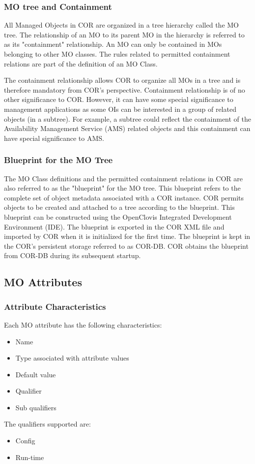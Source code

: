 \begin{flushleft}
\subsubsection{MO tree and Containment}

All Managed Objects in COR are organized in a tree hierarchy called the MO tree. The relationship of an MO to its parent MO in the hierarchy is referred 
to as its "containment" relationship. An MO can only be contained in MOs belonging to other MO classes. The rules related to permitted containment relations 
are part of the definition of an MO Class.

\par
The containment relationship allows COR to organize all MOs in a tree and is therefore mandatory from COR's perspective.
Containment relationship is of no other significance to COR. However, it can have some special significance to management applications as some OIs 
can be interested in a group of related objects (in a subtree). For example, a subtree could reflect the containment of the 
Availability Management Service (AMS) related objects and this containment can have special significance to AMS.

\subsubsection{Blueprint for the MO Tree}

The MO Class definitions and the permitted containment relations in COR are also referred to as the "blueprint" for the MO tree. This blueprint 
refers to the complete set of object metadata associated with a COR instance. COR permits objects to be created and attached to a tree according to the 
blueprint. This blueprint can be constructed using the OpenClovis Integrated Development Environment (IDE). The blueprint is exported in the COR XML
file and imported by COR when it is initialized for the first time. The blueprint is kept in the COR's persistent storage referred to as COR-DB. 
COR obtains the blueprint from COR-DB during its subsequent startup.

\subsection{MO Attributes}
\subsubsection{Attribute Characteristics}
Each MO attribute has the following characteristics:
\begin{itemize}
\item
Name
\item
Type associated with attribute values
\item
Default value
\item
Qualifier
\item
Sub qualifiers
\end{itemize}
The qualifiers supported are:
\begin{itemize}
\item
Config
\item
Run-time
\end{itemize}


\end{flushleft}
